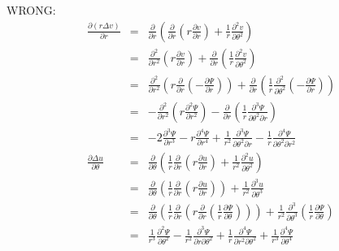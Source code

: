 \newpage

WRONG:
\begin{eqnarray}
\frac{\partial (r  \Delta v)}{\partial r}
&=&
\frac{\partial}{\partial r} \left(   \frac{\partial }{\partial r} \left( r  \frac{\partial v}{\partial r} \right) +  \frac{1}{r} \frac{\partial^2 v}{\partial \theta^2}  \right) \\
&=&
\frac{\partial^2 }{\partial r^2} \left( r  \frac{\partial v}{\partial r} \right) 
+ \frac{\partial }{\partial r} \left( \frac{1}{r} \frac{\partial^2 v}{\partial \theta^2} \right) \\
&=&
\frac{\partial^2 }{\partial r^2} \left( r  \frac{\partial }{\partial r} ( - \frac{\partial \Psi}{\partial r}  ) \right) + \frac{\partial }{\partial r} \left( \frac{1}{r} \frac{\partial^2 }{\partial \theta^2} (- \frac{\partial \Psi}{\partial r}) \right) \\ 
&=&
- \frac{\partial^2 }{\partial r^2} \left( r    \frac{\partial^2 \Psi}{\partial r^2}   \right) - \frac{\partial }{\partial r} \left( \frac{1}{r} \frac{\partial^3 \Psi}{\partial \theta^2 \partial r}  \right) \\ 
&=& - 2  \frac{\partial^3 \Psi}{\partial r^3}  -  r \frac{\partial^4 \Psi}{\partial r^4}
+\frac{1}{r^2} \frac{\partial^3 \Psi}{\partial \theta^2 \partial r}  
- \frac{1}{r} \frac{\partial^4 \Psi}{\partial \theta^2 \partial r^2}
\\
\frac{\partial  \Delta u}{\partial \theta}
&=& \frac{\partial }{\partial \theta} \left(
\frac{1}{r} \frac{\partial }{\partial r} \left( r  \frac{\partial u}{\partial r} \right) 
+  \frac{1}{r^2} \frac{\partial^2 u}{\partial \theta^2}  \right)\\
&=& \frac{\partial }{\partial \theta} \left(
\frac{1}{r} \frac{\partial }{\partial r} \left( r  \frac{\partial u}{\partial r} \right) \right)
+  \frac{1}{r^2} \frac{\partial^3 u}{\partial \theta^3}  \\
&=& \frac{\partial }{\partial \theta} \left(
\frac{1}{r} \frac{\partial }{\partial r} \left( r  \frac{\partial }{\partial r} (  \frac{1}{r}\frac{\partial \Psi}{\partial \theta}  ) \right) \right)
+  \frac{1}{r^2} \frac{\partial^3 }{\partial \theta^3}( \frac{1}{r}\frac{\partial \Psi}{\partial \theta})  \\
&=&
\frac{1}{r^3} \frac{\partial^2 \Psi}{\partial \theta^2} - 
\frac{1}{r^2} \frac{\partial^3 \Psi}{\partial r \partial \theta^2} +
\frac{1}{r} \frac{\partial^4 \Psi}{\partial r^2 \partial \theta^2} +
\frac{1}{r^3} \frac{\partial^4 \Psi}{\partial \theta^4} 
\end{eqnarray}

